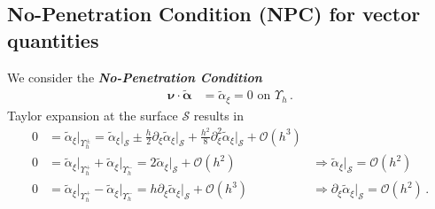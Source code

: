 \documentclass[a4paper,11pt]{scrartcl}
\newcommand{\surf}{\mathcal{S}}
\newcommand{\landau}{\mathcal{O}}
\newcommand{\nub}{\bm{\nu}}
\newcommand{\alphab}{\bm{\alpha}}
\newcommand{\talphab}{\tilde{\alphab}}
\newcommand{\talpha}{\tilde{\alpha}}
\newcommand{\boundary}[1]{\Upsilon_{h}^{#1}}
\newcommand{\AtBoundary}[1]{\big|_{\boundary{#1}}}
\newcommand{\AtSurface}{\big|_{\surf}}
\newcommand{\formPeriod}{\,\text{.}}
\newcommand{\newterm}[1]{\textbf{\textit{#1}}}
\begin{document}
  \subsection{No-Penetration Condition (NPC) for vector quantities}
    We consider the \newterm{No-Penetration Condition}
    \begin{align}
      \nub \cdot \talphab &= \talpha_{\xi} = 0 \text{ on }\boundary{} \formPeriod
      \tag{NPC}
    \end{align}
    Taylor expansion at the surface \( \surf \) results in
    \begin{align}
      0 &= \talpha_{\xi}\AtBoundary{\pm} 
          = \talpha_{\xi}\AtSurface \pm \frac{h}{2}\partial_{\xi}\talpha_{\xi}\AtSurface + \frac{h^{2}}{8}\partial_{\xi}^{2}\talpha_{\xi}\AtSurface + \landau(h^{3})\\
      0 &= \talpha_{\xi}\AtBoundary{+} + \talpha_{\xi}\AtBoundary{-}
         = 2 \talpha_{\xi}\AtSurface + \landau(h^{2}) 
       &\Rightarrow \boxed{\talpha_{\xi}\AtSurface = \landau(h^{2})}\\
      0 &= \talpha_{\xi}\AtBoundary{+} - \talpha_{\xi}\AtBoundary{-}
         = h \partial_{\xi}\talpha_{\xi}\AtSurface + \landau(h^{3})
        &\Rightarrow \boxed{\partial_{\xi}\talpha_{\xi}\AtSurface = \landau(h^{2})} \formPeriod
    \end{align}
\end{document}
